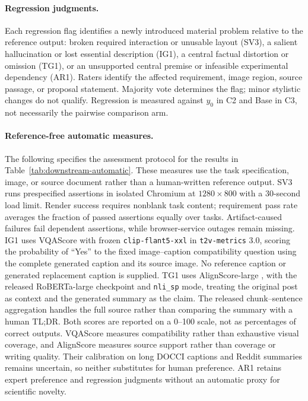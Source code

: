 \paragraph{Regression judgments.}
Each regression flag identifies a newly introduced material problem relative to the reference output: broken required interaction or unusable layout (SV3), a salient hallucination or lost essential description (IG1), a central factual distortion or omission (TG1), or an unsupported central premise or infeasible experimental dependency (AR1).
Raters identify the affected requirement, image region, source passage, or proposal statement.
Majority vote determines the flag; minor stylistic changes do not qualify.
Regression is measured against $y_0$ in C2 and Base in C3, not necessarily the pairwise comparison arm.

\paragraph{Reference-free automatic measures.}
The following specifies the assessment protocol for the results in Table~\ref{tab:downstream-automatic}.
These measures use the task specification, image, or source document rather than a human-written reference output.
SV3 runs prespecified assertions in isolated Chromium at $1280\!\times\!800$ with a 30-second load limit.
Render success requires nonblank task content; requirement pass rate averages the fraction of passed assertions equally over tasks.
Artifact-caused failures fail dependent assertions, while browser-service outages remain missing.
IG1 uses VQAScore \citep{lin2024vqascore} with frozen \texttt{clip-flant5-xxl} in \texttt{t2v-metrics} 3.0, scoring the probability of ``Yes'' to the fixed image--caption compatibility question using the complete generated caption and its source image.
No reference caption or generated replacement caption is supplied.
TG1 uses AlignScore-large \citep{zha2023alignscore}, with the released RoBERTa-large checkpoint and \texttt{nli\_sp} mode, treating the original post as context and the generated summary as the claim.
The released chunk--sentence aggregation handles the full source rather than comparing the summary with a human TL;DR.
Both scores are reported on a 0--100 scale, not as percentages of correct outputs.
VQAScore measures compatibility rather than exhaustive visual coverage, and AlignScore measures source support rather than coverage or writing quality.
Their calibration on long DOCCI captions and Reddit summaries remains uncertain, so neither substitutes for human preference.
AR1 retains expert preference and regression judgments without an automatic proxy for scientific novelty.

